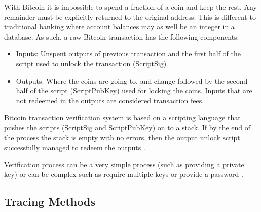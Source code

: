 \documentclass{article}
\begin{document}
With Bitcoin it is impossible to spend a fraction of a coin and keep the rest. Any remainder must be explicitly returned to the original address. This is different to traditional banking where account balances may as well be an integer in a database. As such, a raw Bitcoin transaction has the following components:

\begin{itemize}
  \item Inputs: Unspent outputs of previous transaction and the first half of the script used to unlock the transaction (ScriptSig)
  \item Outputs: Where the coins are going to, and change followed by the second half of the script (ScriptPubKey) used for locking the coins. Inputs that are not redeemed in the outputs are considered transaction fees.
\end{itemize}

Bitcoin transaction verification system is based on  a scripting language that pushes the scripts (ScriptSig and ScriptPubKey) on to a stack. If by the end of the process the stack is empty with no errors, then the output unlock script successfully managed to redeem the outputs \cite{antonopoulos2014mastering}.

Verification process can be a very simple process (such as providing a private key) or can be complex such as require multiple keys or provide a password \cite{antonopoulos2014mastering}.

\subsection{Tracing Methods}
\end{document}
